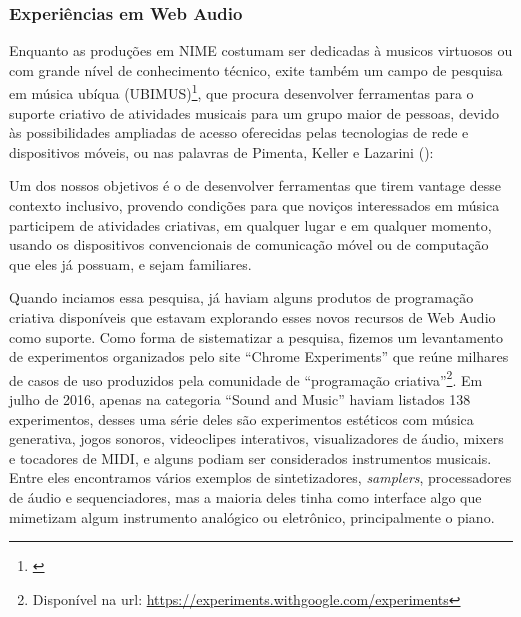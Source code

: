 {\subsubsection{Experiências em Web Audio}
Enquanto as produções em NIME costumam ser dedicadas à musicos virtuosos ou com grande nível de conhecimento técnico, exite também um campo de pesquisa em música ubíqua (UBIMUS)\footnote{\cite{Keller}}, que procura desenvolver ferramentas para o suporte criativo de atividades musicais para um grupo maior de pessoas, devido às possibilidades ampliadas de acesso oferecidas pelas tecnologias de rede e dispositivos móveis, ou nas palavras de Pimenta, Keller e Lazarini (\citeyear{Keller}):

\begin{citacao}
Um dos nossos objetivos é o de desenvolver ferramentas que tirem vantage desse contexto inclusivo, provendo condições para que noviços interessados em música participem de atividades criativas, em qualquer lugar e em qualquer momento, usando os dispositivos convencionais de comunicação móvel ou de computação que eles já possuam, e sejam familiares. \cite[p. 13]{Keller}

\end{citacao}


Quando inciamos essa pesquisa, já haviam alguns produtos de programação criativa disponíveis que estavam explorando esses novos recursos de Web Audio como suporte. Como forma de sistematizar a pesquisa, fizemos um levantamento de experimentos organizados pelo site ``Chrome Experiments'' que reúne milhares de casos de uso produzidos pela comunidade de ``programação criativa''\footnote{Disponível na url: \url{https://experiments.withgoogle.com/experiments}}. Em julho de 2016, apenas na categoria ``Sound and Music''  haviam listados 138 experimentos, desses uma série deles são experimentos estéticos com música generativa, jogos sonoros, videoclipes interativos, visualizadores de áudio, mixers e tocadores de MIDI, e alguns podiam ser considerados instrumentos musicais. Entre eles encontramos vários exemplos de sintetizadores, \emph{samplers}, processadores de áudio e sequenciadores, mas a maioria deles tinha como interface algo que mimetizam algum instrumento analógico ou eletrônico, principalmente o piano.

}
